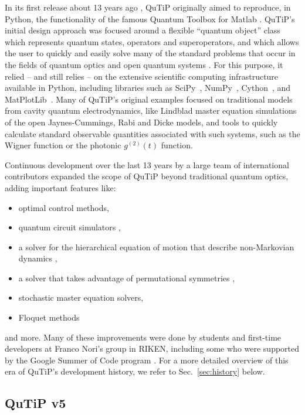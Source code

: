 \documentclass[preprint,3p,sort&compress]{elsarticle}
\begin{document}
In its first release about 13 years ago \cite{Johansson12,Johansson13}, QuTiP originally aimed to reproduce, in Python, the functionality of the famous Quantum Toolbox for Matlab \cite{qotbmtl}. QuTiP's initial design approach was focused around a flexible ``quantum object'' class which represents quantum states, operators and superoperators, and which allows the user to quickly and easily solve many of the standard problems that occur in the fields of quantum optics and open quantum systems \cite{breuer2002theory, Lidar2019}. For this purpose, it relied -- and still relies -- on the extensive scientific computing infrastructure available in Python, including libraries such as SciPy~\cite{virtanen2020scipy}, NumPy~\cite{harris2020array},  Cython~\cite{behnel2010cython}, and MatPlotLib~\cite{hunter2007matplotlib}. Many of QuTiP's original examples focused on traditional models from cavity quantum electrodynamics, like Lindblad master equation simulations of the open Jaynes-Cummings, Rabi and Dicke models, and tools to quickly calculate standard observable quantities associated with such systems, such as the Wigner function or the photonic $g^{(2)}(t)$ function.

Continuous development over the last 13 years by a large team of international contributors expanded the scope of QuTiP beyond traditional quantum optics, adding important features like:
\begin{itemize}
    \item optimal control methods, 
    \item quantum circuit simulators \cite{li2021pulselevel}, 
    \item a solver for the hierarchical equation of motion that describe non-Markovian dynamics \cite{lambert2020bofinheom}, 
    \item a solver that takes advantage of permutational symmetries \cite{Shammah_2018}, 
    \item stochastic master equation solvers,
    \item Floquet methods
    \end{itemize}
    and more.  Many of these improvements were done by students and first-time developers at Franco Nori's group in RIKEN, including some who were supported by the Google Summer of Code program \cite{gsoc}. For a more detailed overview of this era of QuTiP's development history, we refer to Sec.~\ref{sec:history} below.

\subsection{QuTiP v5}
\end{document}
